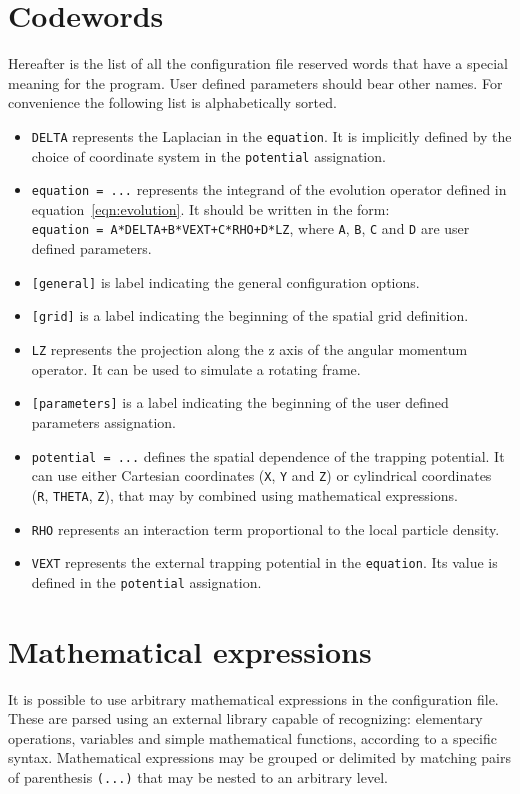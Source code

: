\documentclass[12pt,a4paper]{report}
\begin{document}
\section{\label{sec:codewords}Codewords}
Hereafter is the list of all the configuration file reserved words that have a special meaning for the program.
User defined parameters should bear other names.
For convenience the following list is alphabetically sorted.
\begin{itemize}
\item \texttt{DELTA} represents the Laplacian in the \texttt{equation}. It is implicitly defined by the choice of coordinate system in the \texttt{potential} assignation.
\item \texttt{equation = ...} represents the integrand of the evolution operator defined in equation~\eqref{eqn:evolution}. It should be written in the form:\\ \texttt{equation = A*DELTA+B*VEXT+C*RHO+D*LZ}, where \texttt{A}, \texttt{B}, \texttt{C} and \texttt{D} are user defined parameters.
\item \texttt{[general]} is label indicating the general configuration options.
\item \texttt{[grid]} is a label indicating the beginning of the spatial grid definition.
\item \texttt{LZ} represents the projection along the z axis of the angular momentum operator. It can be used to simulate a rotating frame. 
\item \texttt{[parameters]} is a label indicating the beginning of the user defined parameters assignation.
\item \texttt{potential = ...} defines the spatial dependence of the trapping potential. It can use either Cartesian coordinates (\texttt{X}, \texttt{Y} and \texttt{Z}) or cylindrical coordinates (\texttt{R}, \texttt{THETA}, \texttt{Z}), that may by combined using mathematical expressions.
\item \texttt{RHO} represents an interaction term proportional to the local particle density.
\item \texttt{VEXT} represents the external trapping potential in the \texttt{equation}. Its value is defined in the \texttt{potential} assignation.
\end{itemize}

\section{Mathematical expressions}
It is possible to use arbitrary mathematical expressions in the configuration file.
These are parsed using an external library capable of recognizing: elementary operations, variables and simple mathematical functions, according to a specific syntax.
Mathematical expressions may be grouped or delimited by matching pairs of parenthesis \texttt{(...)} that may be nested to an arbitrary level.
\end{document}
